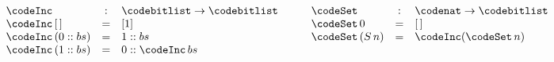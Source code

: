\[
\begin{array}[t]{lcl}
\codeInc &:& \codebitlist \to \codebitlist \\
\codeInc\,[\,] &=& [1] \\
\codeInc\,(0 :: bs) &=& 1 :: bs \\
\codeInc\,(1 :: bs) &=& 0 :: \codeInc\,bs
\end{array}
\qquad
\begin{array}[t]{lcl}
\codeSet &:& \codenat \to \codebitlist \\
\codeSet\,0 &=& [\,] \\
\codeSet\,(S\,n) &=& \codeInc(\codeSet\,n)
\end{array}
\]